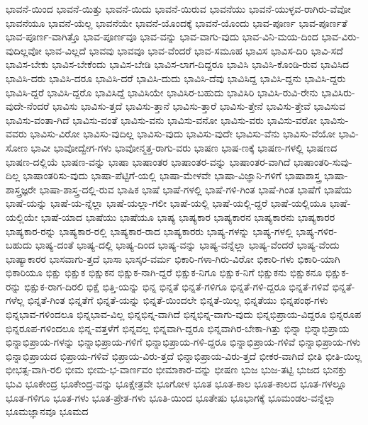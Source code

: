 {ಭಾವನೆ-ಯಿಂದ
ಭಾವನೆ-ಯಿತ್ತು
ಭಾವನೆ-ಯಿದು
ಭಾವನೆ-ಯಿರುವ
ಭಾವನೆಯು
ಭಾವನೆ-ಯುಳ್ಳವ-ರಾಗಿರು-ವೆವೋ
ಭಾವನೆಯೂ
ಭಾವನೆ-ಯೆಲ್ಲ
ಭಾವನೆಯೇ
ಭಾವನೆ-ಯೊಂದಕ್ಕೆ
ಭಾವನೆ-ಯೊಂದು
ಭಾವ-ಪೂರ್ಣ
ಭಾವ-ಪೂರ್ಣತೆ
ಭಾವ-ಪೂರ್ಣ-ವಾಗಿತ್ತೊ
ಭಾವ-ಪೂರ್ಣವೂ
ಭಾವ-ವನ್ನು
ಭಾವ-ವಾಗು-ವುದು
ಭಾವ-ವಿನಿ-ಮಯ-ದಿಂದ
ಭಾವ-ವಿರು-ವುದಿಲ್ಲವೋ
ಭಾವ-ವಿಲ್ಲದೆ
ಭಾವವು
ಭಾವವೂ
ಭಾವ-ವೆಂದರೆ
ಭಾವ-ಸಮೂಹ
ಭಾವಿಸ
ಭಾವಿಸ-ದಿರಿ
ಭಾವಿ-ಸದೆ
ಭಾವಿಸ-ಬೇಕು
ಭಾವಿಸ-ಬೇಕೆಂದು
ಭಾವಿಸ-ಬೇಡಿ
ಭಾವಿಸ-ಲಾಗ-ದಿದ್ದರೂ
ಭಾವಿಸಿ
ಭಾವಿಸಿ-ಕೊಂಡಿ-ರುವ
ಭಾವಿಸಿದ
ಭಾವಿಸಿ-ದರು
ಭಾವಿಸಿ-ದರೂ
ಭಾವಿಸಿ-ದರೆ
ಭಾವಿಸಿ-ದುದು
ಭಾವಿಸಿ-ದೆವು
ಭಾವಿಸಿದ್ದ
ಭಾವಿಸಿ-ದ್ದನು
ಭಾವಿಸಿ-ದ್ದರು
ಭಾವಿಸಿ-ದ್ದರೆ
ಭಾವಿಸಿ-ದ್ದರೊ
ಭಾವಿಸಿದ್ದೆ
ಭಾವಿಸಿಯೇ
ಭಾವಿಸಿರ-ಬಹುದು
ಭಾವಿಸಿರಿ
ಭಾವಿಸಿ-ರುವಿ-ರೇನು
ಭಾವಿಸಿರು-ವುದೇ-ನೆಂದರೆ
ಭಾವಿಸು
ಭಾವಿಸು-ತ್ತದೆ
ಭಾವಿಸು-ತ್ತಾನೆ
ಭಾವಿಸು-ತ್ತಾರೆ
ಭಾವಿಸು-ತ್ತೇನೆ
ಭಾವಿಸು-ತ್ತೇವೆ
ಭಾವಿಸುವ
ಭಾವಿಸು-ವಂತಾ-ಗಿದೆ
ಭಾವಿಸು-ವಂತೆ
ಭಾವಿಸು-ವನು
ಭಾವಿಸು-ವನೋ
ಭಾವಿಸು-ವರು
ಭಾವಿಸು-ವರೋ
ಭಾವಿಸು-ವವರು
ಭಾವಿಸು-ವಿರೋ
ಭಾವಿಸು-ವುದಿಲ್ಲ
ಭಾವಿಸು-ವುದು
ಭಾವಿಸು-ವುದೇ
ಭಾವಿಸು-ವೆನು
ಭಾವಿಸು-ವೆಯೋ
ಭಾವಿ-ಸೋಣ
ಭಾವೀ
ಭಾವೋದ್ವೇಗ-ಗಳು
ಭಾವೋನ್ಮತ್ತ-ರಾಗು-ವರು
ಭಾಷಣ
ಭಾಷ-ಣಕ್ಕೆ
ಭಾಷಣ-ಗಳಲ್ಲಿ
ಭಾಷಣದ
ಭಾಷಣ-ದಲ್ಲಿಯೆ
ಭಾಷಣ-ವನ್ನು
ಭಾಷಾ
ಭಾಷಾಂತರ
ಭಾಷಾಂತರ-ವನ್ನು
ಭಾಷಾಂತರ-ವಾಗಿದೆ
ಭಾಷಾಂತರಿ-ಸುವು-ದಿಲ್ಲ
ಭಾಷಾಂತರಿಸು-ವುದು
ಭಾಷಾ-ಪೆಟ್ಟಿಗೆ-ಯಲ್ಲಿ
ಭಾಷಾ-ಮೇಳವೇ
ಭಾಷಾ-ವಿಜ್ಞಾನಿ-ಗಳಿಗೆ
ಭಾಷಾಶಾಸ್ತ್ರ
ಭಾಷಾ-ಶಾಸ್ತ್ರಜ್ಞರೇ
ಭಾಷಾ-ಶಾಸ್ತ್ರ-ದಲ್ಲಿ-ರುವ
ಭಾಷಿಕ
ಭಾಷೆ
ಭಾಷೆ-ಗಳಲ್ಲಿ
ಭಾಷೆ-ಗಳಿ-ಗಿಂತ
ಭಾಷೆ-ಗಿಂತ
ಭಾಷೆಗೆ
ಭಾಷೆಯ
ಭಾಷೆ-ಯನ್ನು
ಭಾಷೆ-ಯ-ನ್ನೆಲ್ಲಾ
ಭಾಷೆ-ಯಲ್ಲಾ-ಗಲೀ
ಭಾಷೆ-ಯಲ್ಲಿ
ಭಾಷೆ-ಯಲ್ಲಿ-ದ್ದರೆ
ಭಾಷೆ-ಯಲ್ಲಿಯೂ
ಭಾಷೆ-ಯಲ್ಲಿಯೇ
ಭಾಷೆ-ಯಾದ
ಭಾಷೆಯು
ಭಾಷೆಯೂ
ಭಾಷ್ಯ
ಭಾಷ್ಯಕಾರ
ಭಾಷ್ಯಕಾರನ
ಭಾಷ್ಯಕಾರನು
ಭಾಷ್ಯಕಾರರ
ಭಾಷ್ಯಕಾರ-ರನ್ನು
ಭಾಷ್ಯಕಾರ-ರಲ್ಲಿ
ಭಾಷ್ಯಕಾರ-ರಾದ
ಭಾಷ್ಯಕಾರರು
ಭಾಷ್ಯ-ಗಳನ್ನು
ಭಾಷ್ಯ-ಗಳಲ್ಲಿ
ಭಾಷ್ಯ-ಗಳಿರ-ಬಹುದು
ಭಾಷ್ಯ-ದಂತೆ
ಭಾಷ್ಯ-ದಲ್ಲಿ
ಭಾಷ್ಯ-ದಿಂದ
ಭಾಷ್ಯ-ವನ್ನು
ಭಾಷ್ಯ-ವನ್ನೆಲ್ಲಾ
ಭಾಷ್ಯ-ವೆಂದರೆ
ಭಾಷ್ಯ-ವೆಂದು
ಭಾಷ್ಯಾಕಾರರ
ಭಾಸವಾಗು-ತ್ತದೆ
ಭಾಸಾ
ಭಾಸ್ಕರ-ವರ್ಮ
ಭಿಕಾರಿ-ಗಳಾ-ಗಿರು-ವಿರೋ
ಭಿಕಾರಿ-ಗಳು
ಭಿಕಾರಿ-ಯಾಗಿ
ಭಿಕಾರಿಯೂ
ಭಿಕ್ಷು
ಭಿಕ್ಷುಕ
ಭಿಕ್ಷುಕನ
ಭಿಕ್ಷುಕ-ನಾಗಿ-ದ್ದರೆ
ಭಿಕ್ಷುಕ-ನಿಗೂ
ಭಿಕ್ಷುಕ-ನಿಗೆ
ಭಿಕ್ಷುಕನು
ಭಿಕ್ಷುಕನೂ
ಭಿಕ್ಷುಕ-ರನ್ನು
ಭಿಕ್ಷುಕ-ರಾಗ-ದಿರಲಿ
ಭಿಕ್ಷೆ
ಭಿತ್ತಿ-ಯನ್ನು
ಭಿನ್ನ
ಭಿನ್ನತೆ
ಭಿನ್ನತೆ-ಗಳಿಗೂ
ಭಿನ್ನತೆ-ಗಳಿ-ದ್ದರೂ
ಭಿನ್ನತೆ-ಗಳಿವೆ
ಭಿನ್ನತೆ-ಗಳೆಲ್ಲ
ಭಿನ್ನತೆ-ಗಿಂತ
ಭಿನ್ನತೆಗೆ
ಭಿನ್ನತೆ-ಯನ್ನು
ಭಿನ್ನತೆ-ಯಿಂದಲೇ
ಭಿನ್ನತೆ-ಯಿಲ್ಲ
ಭಿನ್ನತೆಯು
ಭಿನ್ನಪಂಥ-ಗಳು
ಭಿನ್ನಭಾವ-ಗಳಿಂದಲೂ
ಭಿನ್ನಭಾವ-ವಿಲ್ಲ
ಭಿನ್ನಭಿನ್ನ-ವಾಗಿದೆ
ಭಿನ್ನಭಿನ್ನ-ವಾಗು-ವುದು
ಭಿನ್ನಭಿಪ್ರಾಯ-ವಿದ್ದರೂ
ಭಿನ್ನರೂಪ
ಭಿನ್ನರೂಪ-ಗಳಿಂದಲೂ
ಭಿನ್ನ-ವತ್ತಳೆಗೆ
ಭಿನ್ನವಲ್ಲ
ಭಿನ್ನವಾಗಿ-ದ್ದರೂ
ಭಿನ್ನವಾಗಿರ-ಬೇಕಾ-ಗಿತ್ತು
ಭಿನ್ನಾ
ಭಿನ್ನಾಭಿಪ್ರಾಯ
ಭಿನ್ನಾಭಿಪ್ರಾಯ-ಗಳನ್ನು
ಭಿನ್ನಾಭಿಪ್ರಾಯ-ಗಳಿಗೆ
ಭಿನ್ನಾಭಿಪ್ರಾಯ-ಗಳಿ-ದ್ದರೂ
ಭಿನ್ನಾಭಿಪ್ರಾಯ-ಗಳಿವೆ
ಭಿನ್ನಾಭಿಪ್ರಾಯ-ಗಳು
ಭಿನ್ನಾಭಿಪ್ರಾಯದ
ಭಿಪ್ರಾಯ-ಗಳಿವೆ
ಭಿಪ್ರಾಯ-ವಿರು-ತ್ತದೆ
ಭಿನ್ನಾಭಿಪ್ರಾಯ-ವಿರು-ತ್ತದೆ
ಭೀಕರ-ವಾಗಿದೆ
ಭೀತಿ
ಭೀತಿ-ಯಿಲ್ಲ
ಭೀಭತ್ಸ-ವಾಗಿ-ರಲಿ
ಭೀಮ
ಭೀಮ-ಭ-ವಾರ್ಣವಂ
ಭೀಮಾಕಾರ-ವನ್ನು
ಭೀಷಣ
ಭುಜ
ಭುಜ-ತಟ್ಟಿ
ಭುಜದ
ಭುನಕ್ತು
ಭುವಿ
ಭೂಕೇಂದ್ರ
ಭೂಕೇಂದ್ರ-ವನ್ನು
ಭೂಕ್ಷೇತ್ರವೇ
ಭೂಗೋಳ
ಭೂತ
ಭೂತ-ಕಾಲ
ಭೂತ-ಕಾಲದ
ಭೂತ-ಗಳಲ್ಲೂ
ಭೂತ-ಗಳಿಗೂ
ಭೂತ-ಗಳು
ಭೂತ-ಪ್ರೇತ-ಗಳು
ಭೂತಿ-ಯಿಂದ
ಭೂತೇಷು
ಭೂಭಾಗಕ್ಕೆ
ಭೂಮಂಡಲ-ವನ್ನೆಲ್ಲಾ
ಭೂಮಜ್ಞಾನವೂ
ಭೂಮದ
}
